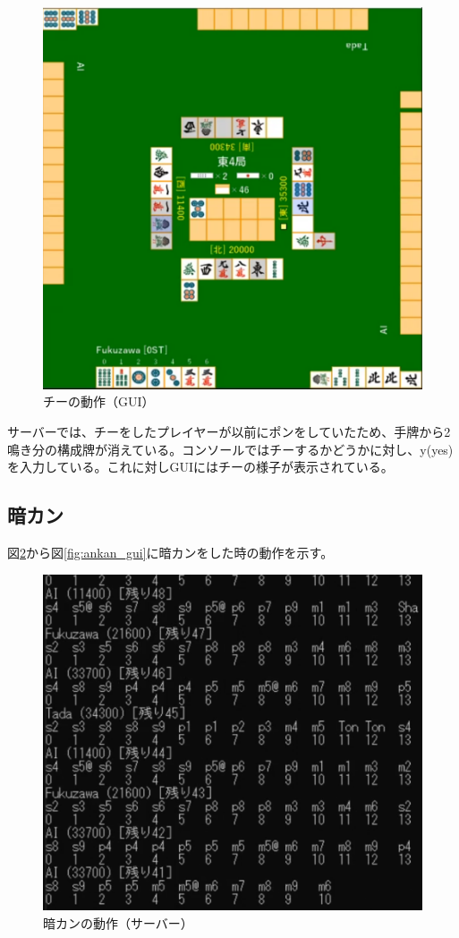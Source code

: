 \documentclass[a4j,titlepage]{jsarticle}
\begin{document}
\begin{figure}[htbp]
  \centering
  \includegraphics[width = 0.8\linewidth]{images/chi_gui.png}
  \caption{チーの動作（GUI）}
  \label{fig:chi_gui}
\end{figure}

サーバーでは、チーをしたプレイヤーが以前にポンをしていたため、手牌から2鳴き分の構成牌が消えている。コンソールではチーするかどうかに対し、y(yes)を入力している。これに対しGUIにはチーの様子が表示されている。

\subsection{暗カン}
図\ref{fig:ankan_server}から図\ref{fig:ankan_gui}に暗カンをした時の動作を示す。

\begin{figure}[htbp]
  \centering
  \includegraphics[width = 0.8\linewidth]{images/ankan_server.png}
  \caption{暗カンの動作（サーバー）}
  \label{fig:ankan_server}
\end{figure}
\end{document}
